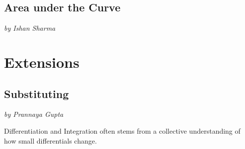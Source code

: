 \documentclass[a4paper,12pt,oneside]{book}
\begin{document}
\newpage
\chapter{Area under the Curve}
\vspace{-30pt}
\large \textit{by Ishan Sharma}


\part{Extensions}

\newpage
\chapter{Substituting}
\vspace{-30pt}
\large \textit{by Prannaya Gupta}

Differentiation and Integration often stems from a collective understanding of how small differentials change.
\end{document}
